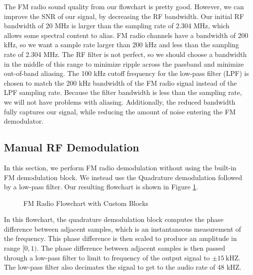 \documentclass{article}
\begin{document}
The FM radio sound quality from our flowchart is pretty good. However, we can improve the SNR of our signal, by decreasing the RF bandwidth. Our initial RF bandwidth of 20 MHz is larger than the sampling rate of 2.304 MHz, which allows some spectral content to alias. FM radio channels have a bandwidth of 200 kHz, so we want a sample rate larger than 200 kHz and less than the sampling rate of 2.304 MHz. The RF filter is not perfect, so we should choose a bandwidth in the middle of this range to minimize ripple across the passband and minimize out-of-band aliasing. The 100 kHz cutoff frequency for the low-pass filter (LPF) is chosen to match the 200 kHz bandwidth of the FM radio signal instead of the LPF sampling rate. Because the filter bandwidth is less than the sampling rate, we will not have problems with aliasing. Additionally, the reduced bandwidth fully captures our signal, while reducing the amount of noise entering the FM demodulator.

\subsection{Manual RF Demodulation}

In this section, we perform FM radio demodulation without using the built-in FM demodulation block. We instead use the Quadrature demodulation followed by a low-pass filter. Our resulting flowchart is shown in Figure \ref{fig::fm_radio_user_flowchart}.

\begin{figure}[H]
	\centerline{}
	\caption{FM Radio Flowchart with Custom Blocks}
	\label{fig::fm_radio_user_flowchart}
\end{figure}

\noindent In this flowchart, the quadrature demodulation block computes the phase difference between adjacent samples, which is an instantaneous measurement of the frequency. This phase difference is then scaled to produce an amplitude in range $[0, 1)$. The phase difference between adjacent samples is then passed through a low-pass filter to limit to frequency of the output signal to $\pm 15\ \text{kHZ}$. The low-pass filter also decimates the signal to get to the audio rate of 48 kHZ.
\end{document}
